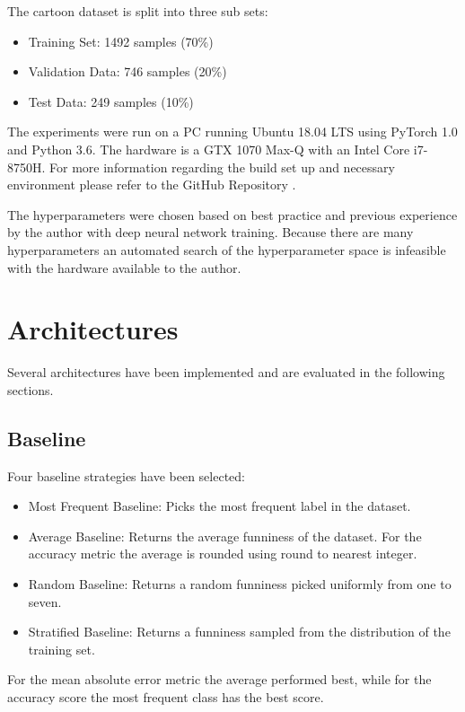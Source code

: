 \documentclass[draft,final,oneside]{vutinfth} %
\begin{document}
The cartoon dataset is split into three sub sets:

\begin{itemize}
\item Training Set: 1492 samples (70\%)
\item Validation Data: 746 samples (20\%)
\item Test Data: 249 samples (10\%)
\end{itemize}

The experiments were run on a PC running Ubuntu 18.04 LTS using PyTorch 1.0 and
Python 3.6. The hardware is a GTX 1070 Max-Q with an Intel Core i7-8750H. For more
information regarding the build set up and necessary environment please refer to the GitHub Repository \cite{deephumorrepo}.

The hyperparameters were chosen based on best practice and previous
experience by the author with deep neural network training. Because there are many hyperparameters an automated search of the hyperparameter space is infeasible with the hardware available to the author.

\section{Architectures}
Several architectures have been implemented and are evaluated in the following sections.


\subsection{Baseline}

Four baseline strategies have been selected: 

\begin{itemize}

\item Most Frequent Baseline: Picks the most frequent label in the dataset.
\item Average Baseline: Returns the average funniness of the dataset. For the accuracy metric the average is rounded using round to nearest integer.
\item Random Baseline: Returns a random funniness picked uniformly from one to seven.
\item Stratified Baseline: Returns a funniness sampled from the distribution of the
training set.

\end{itemize}

For the mean absolute error metric the average performed best, while for the accuracy score the most frequent class has the best score.
\end{document}
